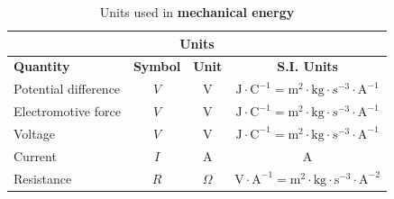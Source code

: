 \begin{table}[H]
\begin{center}
\begin{tabular}{|l|c|c|c|}\hline \hline 
\multicolumn{4}{|c|}{\textbf{Units}}\\ \hline \hline
\textbf{Quantity} & \textbf{Symbol} & \textbf{Unit} & \textbf{S.I. Units}\\ \hline
Potential difference & $V$ & V & $\text{J}\cdot\text{C}^{-1}=\text{m}^2\cdot\text{kg}\cdot{s}^{-3}\cdot\text{A}^{-1}$ \\ \hline
Electromotive force & $V$ & V & $\text{J}\cdot\text{C}^{-1}=\text{m}^2\cdot\text{kg}\cdot{s}^{-3}\cdot\text{A}^{-1}$ \\ \hline
Voltage & $V$ & V & $\text{J}\cdot\text{C}^{-1}=\text{m}^2\cdot\text{kg}\cdot{s}^{-3}\cdot\text{A}^{-1}$ \\ \hline
Current & $I$ & A & A \\ \hline
Resistance & $R$ & $\Omega$ & $\text{V}\cdot\text{A}^{-1} = \text{m}^2\cdot\text{kg}\cdot\text{s}^{-3}\cdot\text{A}^{-2}$ \\ \hline
\end{tabular}
\end{center}
\caption{Units used in \textbf{mechanical energy} }
\label{table:electricity::units}
\end{table}


